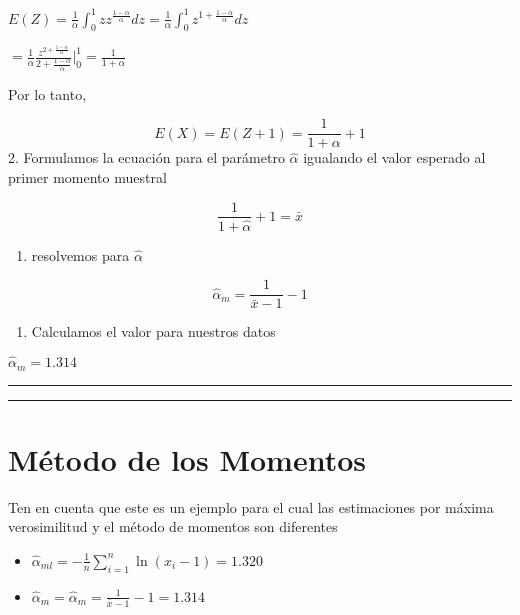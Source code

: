 \documentclass[
]{book}
\providecommand{\tightlist}{%
  \setlength{\itemsep}{0pt}\setlength{\parskip}{0pt}}
\begin{document}
\(E(Z)= \frac{1}{\alpha} \int_0^1 z z^{\frac{1-\alpha}{\alpha}}dz= \frac{1}{\alpha} \int_0^1 z^{1+\frac{1-\alpha}{\alpha}}dz\)

\(= \frac{1}{\alpha} \frac{z^{2+\frac{1-\alpha}{\alpha}}}{{2+\frac{1-\alpha}{\alpha}} } |_0^1=\frac{1}{1+\alpha}\)

Por lo tanto,

\[E(X)=E(Z+1)=\frac{1}{1+\alpha}+1\]
2. Formulamos la ecuación para el parámetro \(\hat{\alpha}\) igualando el valor esperado al primer momento muestral

\[\frac{1}{1+\hat{\alpha}}+1=\bar{x}\]

\begin{enumerate}
\def\labelenumi{\arabic{enumi}.}
\setcounter{enumi}{2}
\tightlist
\item
  resolvemos para \(\hat{\alpha}\)
\end{enumerate}

\[\hat{\alpha}_m=\frac{1}{\bar{x}-1}-1\]

\begin{enumerate}
\def\labelenumi{\arabic{enumi}.}
\setcounter{enumi}{3}
\tightlist
\item
  Calculamos el valor para nuestros datos
\end{enumerate}

\(\hat{\alpha}_m=1.314\)

\begin{center}\rule{0.5\linewidth}{0.5pt}\end{center}

\begin{center}\rule{0.5\linewidth}{0.5pt}\end{center}

\hypertarget{muxe9todo-de-los-momentos-10}{%
\section{Método de los Momentos}\label{muxe9todo-de-los-momentos-10}}

Ten en cuenta que este es un ejemplo para el cual las estimaciones por máxima verosimilitud y el método de momentos son diferentes

\begin{itemize}
\item
  \(\hat{\alpha}_{ml}=-\frac{1}{n}\sum_{i=1}^n \ln (x_i-1)=1.320\)
\item
  \(\hat{\alpha}_m=\hat{\alpha}_m=\frac{1}{\bar{x}-1}-1=1.314\)
\end{itemize}
\end{document}
